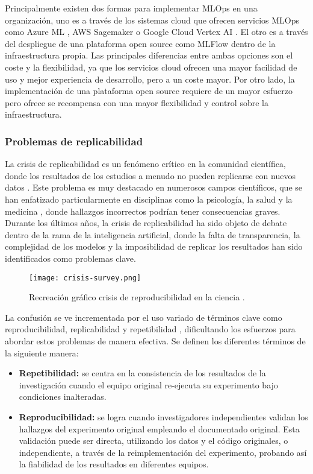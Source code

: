 Principalmente existen dos formas para implementar MLOps en una organización, uno es
a través de los sistemas cloud que ofrecen servicios MLOps como Azure ML \cite{microsoft2023azureml}, 
AWS Sagemaker \cite{aws_sagemaker} o Google Cloud Vertex AI \cite{google2023vertexai}. El otro es a través del despliegue de una plataforma open source
como MLFlow dentro de la infraestructura propia. Las principales diferencias entre ambas
opciones son el coste y la flexibilidad, ya que los servicios cloud ofrecen una mayor
facilidad de uso y mejor experiencia de desarrollo, pero a un coste mayor. Por otro lado,
la implementación de una plataforma open source requiere de un mayor esfuerzo pero ofrece
se recompensa con una mayor flexibilidad y control sobre la infraestructura.

\subsubsection{Problemas de replicabilidad}
La crisis de replicabilidad es un fenómeno crítico en la comunidad científica,  
donde los resultados de los estudios a menudo no pueden replicarse con nuevos datos \cite{puetz2024replication}.
Este problema es muy destacado en numerosos campos científicos, que se han enfatizado particularmente 
en disciplinas como la psicología, la salud y la medicina \cite{puetz2024replication}\cite{Baker_2016}, donde hallazgos incorrectos 
podrían tener consecuencias graves. Durante los últimos años, la crisis de replicabilidad ha
sido objeto de debate dentro de la rama de la inteligencia artificial, donde la falta de
transparencia, la complejidad de los modelos y la imposibilidad de replicar los resultados
han sido identificados como problemas clave.

\begin{figure}[ht]
    \centering
    \texttt{[image: crisis-survey.png]}
    \caption{Recreación gráfico crisis de reproducibilidad en la ciencia \cite{Baker_2016}.}
    \label{fig:crisis-survey}
\end{figure}

La confusión se ve incrementada por el uso variado de términos clave como reproducibilidad, 
replicabilidad y repetibilidad \cite{readytensor},  dificultando los esfuerzos para abordar estos problemas de 
manera efectiva. Se definen los diferentes términos de la siguiente manera:
\begin{itemize}
    \item \textbf{Repetibilidad:} se centra en la consistencia de los resultados de la investigación cuando el equipo 
    original re-ejecuta su experimento bajo condiciones inalteradas. 
    \item \textbf {Reproducibilidad:} se logra cuando investigadores independientes validan los hallazgos del 
    experimento original empleando el documentado original. Esta validación puede ser directa, utilizando 
    los datos y el código originales, o independiente, a través de la reimplementación del experimento, 
    probando así la fiabilidad de los resultados en diferentes equipos.
\end{itemize}

